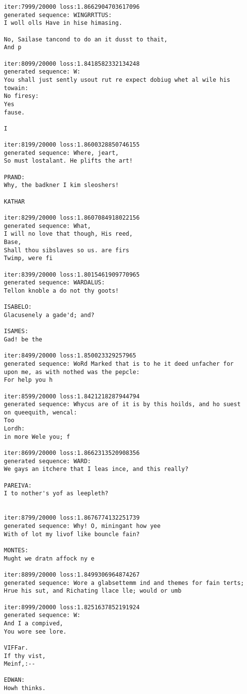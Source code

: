 \documentclass[11pt]{article}
\begin{document}
\begin{Verbatim}[commandchars=\\\{\}]
iter:7999/20000 loss:1.8662904703617096
generated sequence: WINGRRTTUS:
I woll olls Have in hise himasing.

No, Sailase tancond to do an it dusst to thait,
And p

iter:8099/20000 loss:1.8418582332134248
generated sequence: W:
You shall just sently usout rut re expect dobiug whet al wile his towain:
No firesy:
Yes
fause.

I

iter:8199/20000 loss:1.8600328850746155
generated sequence: Where, jeart,
So must lostalant. He plifts the art!

PRAND:
Why, the badkner I kim sleoshers!

KATHAR

iter:8299/20000 loss:1.8607084918022156
generated sequence: What,
I will no love that though, His reed,
Base,
Shall thou sibslaves so us. are firs
Twimp, were fi

iter:8399/20000 loss:1.8015461909770965
generated sequence: WARDALUS:
Tellon knoble a do not thy goots!

ISABELO:
Glacusenely a gade'd; and?

ISAMES:
Gad! be the

iter:8499/20000 loss:1.850023329257965
generated sequence: WoRd Marked that is to he it deed unfacher for upon me, as with nothed was the pepcle:
For help you h

iter:8599/20000 loss:1.8421218287944794
generated sequence: Whycus are of it is by this hoilds, and ho suest on queequith, wencal:
Too
Lordh:
in more Wele you; f

iter:8699/20000 loss:1.8662313520908356
generated sequence: WARD:
We gays an itchere that I leas ince, and this really?

PAREIVA:
I to nother's yof as leepleth?


iter:8799/20000 loss:1.8676774132251739
generated sequence: Why! O, miningant how yee
With of lot my livof like bouncle fain?

MONTES:
Mught we dratn affock ny e

iter:8899/20000 loss:1.8499306964874267
generated sequence: Wore a glabsettemm ind and themes for fain terts;
Hrue his sut, and Richating llace lle; would or umb

iter:8999/20000 loss:1.8251637852191924
generated sequence: W:
And I a compived,
You wore see lore.

VIFFar.
If thy vist,
Meinf,:--

EDWAN:
Howh thinks.


\end{Verbatim}
\end{document}
